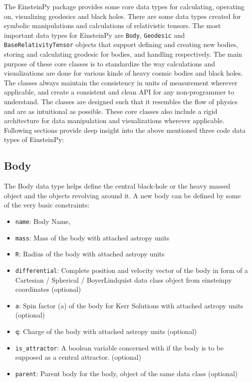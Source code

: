\documentclass{aastex63}
\begin{document}
The EinsteinPy package provides some core data types for calculating, operating on, visualizing geodesics and black holes. There are some data types created for symbolic manipulations and calculations of relativistic tensors. The most important data types for EinsteinPy are \texttt{Body}, \texttt{Geodesic} and \texttt{BaseRelativityTensor} objects that support defining and creating new bodies, storing and calculating geodesic for bodies, and handling respectively. The main purpose of these core classes is to standardize the way calculations and visualizations are done for various kinds of heavy cosmic bodies and black holes. The classes always maintain the consistency in units of measurement wherever applicable, and create a consistent and clean API for any non-programmer to understand. The classes are designed such that it resembles the flow of physics and are  as intuitional as possible. These core classes also include a rigid architecture for data manipulation and visualizations wherever applicable. Following sections provide deep insight into the above mentioned three code data types of EinsteinPy:

\subsection{Body} \label{subsec:Body}
The Body data type helps define the central black-hole or the heavy massed object and the objects revolving around it. A new body can be defined by some of the very basic constraints:

\begin{itemize}
\item \texttt{name}: Body Name,
\item \texttt{mass}: Mass of the body with attached astropy units 
\item \texttt{R}: Radius of the body with attached astropy units
\item \texttt{differential}: Complete position and velocity vector of the body in form of a Cartesian / Spherical / BoyerLindquist data class object from einsteinpy coordinates (optional)
\item \texttt{a}: Spin factor (a) of the body for Kerr Solutions with attached astropy units (optional)
\item \texttt{q}: Charge of the body with attached astropy units (optional)
\item \texttt{is\_attractor}: A boolean variable concerned with if the body is to be supposed as a central attractor. (optional)
\item \texttt{parent}: Parent body for the body, object of the same data class (optional)
\end{itemize}
\end{document}
